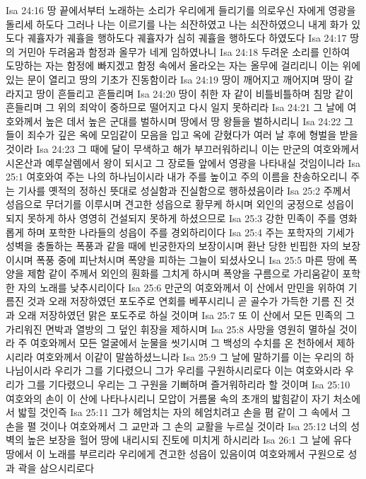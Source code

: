 Isa 24:16  땅 끝에서부터 노래하는 소리가 우리에게 들리기를 의로우신 자에게 영광을 돌리세 하도다 그러나 나는 이르기를 나는 쇠잔하였고 나는 쇠잔하였으니 내게 화가 있도다 궤휼자가 궤휼을 행하도다 궤휼자가 심히 궤휼을 행하도다 하였도다
Isa 24:17  땅의 거민아 두려움과 함정과 올무가 네게 임하였나니
Isa 24:18  두려운 소리를 인하여 도망하는 자는 함정에 빠지겠고 함정 속에서 올라오는 자는 올무에 걸리리니 이는 위에 있는 문이 열리고 땅의 기초가 진동함이라
Isa 24:19  땅이 깨어지고 깨어지며 땅이 갈라지고 땅이 흔들리고 흔들리며
Isa 24:20  땅이 취한 자 같이 비틀비틀하며 침망 같이 흔들리며 그 위의 죄악이 중하므로 떨어지고 다시 일지 못하리라
Isa 24:21  그 날에 여호와께서 높은 데서 높은 군대를 벌하시며 땅에서 땅 왕들을 벌하시리니
Isa 24:22  그들이 죄수가 깊은 옥에 모임같이 모음을 입고 옥에 갇혔다가 여러 날 후에 형벌을 받을 것이라
Isa 24:23  그 때에 달이 무색하고 해가 부끄러워하리니 이는 만군의 여호와께서 시온산과 예루살렘에서 왕이 되시고 그 장로들 앞에서 영광을 나타내실 것임이니라
Isa 25:1  여호와여 주는 나의 하나님이시라 내가 주를 높이고 주의 이름을 찬송하오리니 주는 기사를 옛적의 정하신 뜻대로 성실함과 진실함으로 행하셨음이라
Isa 25:2  주께서 성읍으로 무더기를 이루시며 견고한 성읍으로 황무케 하시며 외인의 궁정으로 성읍이 되지 못하게 하사 영영히 건설되지 못하게 하셨으므로
Isa 25:3  강한 민족이 주를 영화롭게 하며 포학한 나라들의 성읍이 주를 경외하리이다
Isa 25:4  주는 포학자의 기세가 성벽을 충돌하는 폭풍과 같을 때에 빈궁한자의 보장이시며 환난 당한 빈핍한 자의 보장이시며 폭풍 중에 피난처시며 폭양을 피하는 그늘이 되셨사오니
Isa 25:5  마른 땅에 폭양을 제함 같이 주께서 외인의 훤화를 그치게 하시며 폭양을 구름으로 가리움같이 포학한 자의 노래를 낮추시리이다
Isa 25:6  만군의 여호와께서 이 산에서 만민을 위하여 기름진 것과 오래 저장하였던 포도주로 연회를 베푸시리니 곧 골수가 가득한 기름 진 것과 오래 저장하였던 맑은 포도주로 하실 것이며
Isa 25:7  또 이 산에서 모든 민족의 그 가리워진 면박과 열방의 그 덮인 휘장을 제하시며
Isa 25:8  사망을 영원히 멸하실 것이라 주 여호와께서 모든 얼굴에서 눈물을 씻기시며 그 백성의 수치를 온 천하에서 제하시리라 여호와께서 이같이 말씀하셨느니라
Isa 25:9  그 날에 말하기를 이는 우리의 하나님이시라 우리가 그를 기다렸으니 그가 우리를 구원하시리로다 이는 여호와시라 우리가 그를 기다렸으니 우리는 그 구원을 기뻐하며 즐거워하리라 할 것이며
Isa 25:10  여호와의 손이 이 산에 나타나시리니 모압이 거름물 속의 초개의 밟힘같이 자기 처소에서 밟힐 것인즉
Isa 25:11  그가 헤엄치는 자의 헤엄치려고 손을 폄 같이 그 속에서 그 손을 펼 것이나 여호와께서 그 교만과 그 손의 교활을 누르실 것이라
Isa 25:12  너의 성벽의 높은 보장을 헐어 땅에 내리시되 진토에 미치게 하시리라
Isa 26:1  그 날에 유다 땅에서 이 노래를 부르리라 우리에게 견고한 성읍이 있음이여 여호와께서 구원으로 성과 곽을 삼으시리로다
